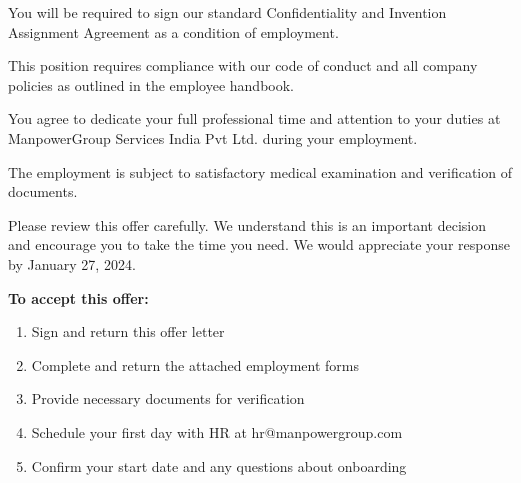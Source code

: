 \documentclass[a4paper,8pt]{article}
\begin{document}
You will be required to sign our standard Confidentiality and Invention Assignment Agreement as a condition of employment.

\vspace{0.25cm}

This position requires compliance with our code of conduct and all company policies as outlined in the employee handbook.

\vspace{0.25cm}

You agree to dedicate your full professional time and attention to your duties at ManpowerGroup Services India Pvt Ltd. during your employment.

\vspace{0.25cm}

The employment is subject to satisfactory medical examination and verification of documents.

\vspace{0.25cm}


\vspace{0.4cm}


\begin{tcolorbox}[
    colback=orange!5!white,
    colframe=orange!75!black,
    title=Next Steps,
    fonttitle=\bfseries
]
Please review this offer carefully. We understand this is an important decision and encourage you to take the time you need. We would appreciate your response by January 27, 2024.
\end{tcolorbox} 

\vspace{0.4cm}

\textbf{To accept this offer:}
 
\begin{enumerate}
    
    \item Sign and return this offer letter
    
    \item Complete and return the attached employment forms
    
    \item Provide necessary documents for verification
    
    \item Schedule your first day with HR at hr@manpowergroup.com
    
    \item Confirm your start date and any questions about onboarding
    
\end{enumerate} 
\end{document}
